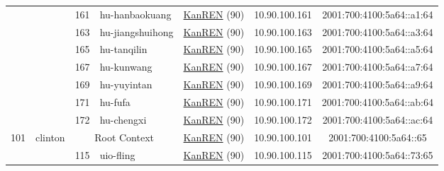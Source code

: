 \begin{small}
\begin{center}
\begin{longtable}{|c|c|c|c|c|c|c|c|}
  &  & \tiny{161} & \multicolumn{1}{|l|}{\tiny{hu-hanbaokuang}} & \multicolumn{2}{|c|}{\tiny{\href{http://www.kanren.net}{KanREN} (90)}} & \tiny{10.90.100.161} & \tiny{2001:700:4100:5a64::a1:64} \\* \cline{3-3}\cline{4-4}\cline{5-5}\cline{6-6}\cline{7-7}\cline{8-8}
  &  & \tiny{163} & \multicolumn{1}{|l|}{\tiny{hu-jiangshuihong}} & \multicolumn{2}{|c|}{\tiny{\href{http://www.kanren.net}{KanREN} (90)}} & \tiny{10.90.100.163} & \tiny{2001:700:4100:5a64::a3:64} \\* \cline{3-3}\cline{4-4}\cline{5-5}\cline{6-6}\cline{7-7}\cline{8-8}
  &  & \tiny{165} & \multicolumn{1}{|l|}{\tiny{hu-tanqilin}} & \multicolumn{2}{|c|}{\tiny{\href{http://www.kanren.net}{KanREN} (90)}} & \tiny{10.90.100.165} & \tiny{2001:700:4100:5a64::a5:64} \\* \cline{3-3}\cline{4-4}\cline{5-5}\cline{6-6}\cline{7-7}\cline{8-8}
  &  & \tiny{167} & \multicolumn{1}{|l|}{\tiny{hu-kunwang}} & \multicolumn{2}{|c|}{\tiny{\href{http://www.kanren.net}{KanREN} (90)}} & \tiny{10.90.100.167} & \tiny{2001:700:4100:5a64::a7:64} \\* \cline{3-3}\cline{4-4}\cline{5-5}\cline{6-6}\cline{7-7}\cline{8-8}
  &  & \tiny{169} & \multicolumn{1}{|l|}{\tiny{hu-yuyintan}} & \multicolumn{2}{|c|}{\tiny{\href{http://www.kanren.net}{KanREN} (90)}} & \tiny{10.90.100.169} & \tiny{2001:700:4100:5a64::a9:64} \\* \cline{3-3}\cline{4-4}\cline{5-5}\cline{6-6}\cline{7-7}\cline{8-8}
  &  & \tiny{171} & \multicolumn{1}{|l|}{\tiny{hu-fufa}} & \multicolumn{2}{|c|}{\tiny{\href{http://www.kanren.net}{KanREN} (90)}} & \tiny{10.90.100.171} & \tiny{2001:700:4100:5a64::ab:64} \\* \cline{3-3}\cline{4-4}\cline{5-5}\cline{6-6}\cline{7-7}\cline{8-8}
  &  & \tiny{172} & \multicolumn{1}{|l|}{\tiny{hu-chengxi}} & \multicolumn{2}{|c|}{\tiny{\href{http://www.kanren.net}{KanREN} (90)}} & \tiny{10.90.100.172} & \tiny{2001:700:4100:5a64::ac:64} \\ \hline
 \multirow{30}{*}{\tiny{101}} & \multicolumn{1}{|l|}{\multirow{30}{*}{\tiny{clinton}}} & \multicolumn{2}{|c|}{\tiny{Root Context}} & \multicolumn{2}{|c|}{\tiny{\href{http://www.kanren.net}{KanREN} (90)}} & \tiny{10.90.100.101} & \tiny{2001:700:4100:5a64::65} \\* \cline{3-3}\cline{4-4}\cline{5-5}\cline{6-6}\cline{7-7}\cline{8-8}
  &  & \tiny{115} & \multicolumn{1}{|l|}{\tiny{uio-fling}} & \multicolumn{2}{|c|}{\tiny{\href{http://www.kanren.net}{KanREN} (90)}} & \tiny{10.90.100.115} & \tiny{2001:700:4100:5a64::73:65} \\* \cline{3-3}\cline{4-4}\cline{5-5}\cline{6-6}\cline{7-7}\cline{8-8}

\end{longtable}
\end{center}
\end{small}
